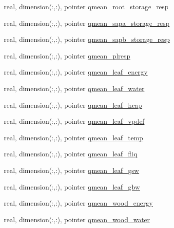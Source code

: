 \begin{DoxyCompactItemize}
\item 
real, dimension(\+:,\+:), pointer \hyperlink{structed__state__vars_1_1patchtype_a8d454b25151f3eb36492a351b0598a05}{qmean\+\_\+root\+\_\+storage\+\_\+resp}
\item 
real, dimension(\+:,\+:), pointer \hyperlink{structed__state__vars_1_1patchtype_a88bd202edf84423c6adb5f2b636129a6}{qmean\+\_\+sapa\+\_\+storage\+\_\+resp}
\item 
real, dimension(\+:,\+:), pointer \hyperlink{structed__state__vars_1_1patchtype_a932705dfb508703a78db47e8adbee2ae}{qmean\+\_\+sapb\+\_\+storage\+\_\+resp}
\item 
real, dimension(\+:,\+:), pointer \hyperlink{structed__state__vars_1_1patchtype_a5018fae7b81a8bde83674e4be144c6a2}{qmean\+\_\+plresp}
\item 
real, dimension(\+:,\+:), pointer \hyperlink{structed__state__vars_1_1patchtype_a3306cc9a379453c9c7885f5c9cb5de74}{qmean\+\_\+leaf\+\_\+energy}
\item 
real, dimension(\+:,\+:), pointer \hyperlink{structed__state__vars_1_1patchtype_a5ed26f020947693b6c08acf6485ad89c}{qmean\+\_\+leaf\+\_\+water}
\item 
real, dimension(\+:,\+:), pointer \hyperlink{structed__state__vars_1_1patchtype_a729658129de45bcaed232f264aa71c0e}{qmean\+\_\+leaf\+\_\+hcap}
\item 
real, dimension(\+:,\+:), pointer \hyperlink{structed__state__vars_1_1patchtype_a371c655c74e6455ca2f9a033edf39e69}{qmean\+\_\+leaf\+\_\+vpdef}
\item 
real, dimension(\+:,\+:), pointer \hyperlink{structed__state__vars_1_1patchtype_a52d6e894028927f5d6f2720e38f5268f}{qmean\+\_\+leaf\+\_\+temp}
\item 
real, dimension(\+:,\+:), pointer \hyperlink{structed__state__vars_1_1patchtype_ac5a029d546c28c54db73222cd89bc1d3}{qmean\+\_\+leaf\+\_\+fliq}
\item 
real, dimension(\+:,\+:), pointer \hyperlink{structed__state__vars_1_1patchtype_a4c013430e4515acd73ff177b526f1086}{qmean\+\_\+leaf\+\_\+gsw}
\item 
real, dimension(\+:,\+:), pointer \hyperlink{structed__state__vars_1_1patchtype_a565d2a4311b86f0a8434690b4f4a85a2}{qmean\+\_\+leaf\+\_\+gbw}
\item 
real, dimension(\+:,\+:), pointer \hyperlink{structed__state__vars_1_1patchtype_a28bb21c7977d0cd8191e4f9767c09e88}{qmean\+\_\+wood\+\_\+energy}
\item 
real, dimension(\+:,\+:), pointer \hyperlink{structed__state__vars_1_1patchtype_a562e5df4c3d09bee6e141b83325b680d}{qmean\+\_\+wood\+\_\+water}

\end{DoxyCompactItemize}
